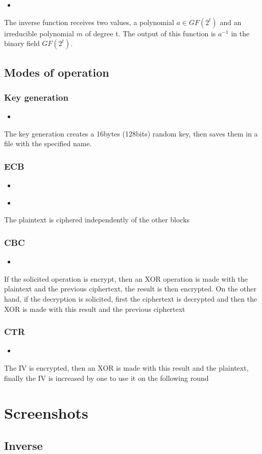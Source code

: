 \documentclass[titlepage, 12pt]{article}
\numberwithin{equation}{section}%
\numberwithin{figure}{section}%
\numberwithin{table}{section}%
\newcommand{\delimitCodeScript}[6][]{
	\begin{itemize}
		\item[]
	\end{itemize}	
}
\begin{document}
		\delimitCodeScript{c}{Section2CodeInverse/EuclidesPolinomios}{Inverse}{44}{84}
		The inverse function receives two values, a polynomial $a \in GF(2^{t})$ and an irreducible polynomial $m$ of degree t. The output of this function is $a^{-1}$ in the binary field $GF(2^{t})$.
		

	
	\subsection{Modes of operation}
	\subsubsection{Key generation}
		\delimitCodeScript{cpp}{Section2Code/Functions}{Key generation}{12}{23}
		The key generation creates a 16bytes (128bits) random key, then saves them in a file with the specified name.
	\subsubsection{ECB}
		\delimitCodeScript{cpp}{Section2Code/Functions}{ECB mode}{65}{66}
		\delimitCodeScript{cpp}{Section2Code/Functions}{AES}{127}{134}
		The plaintext is ciphered independently of the other blocks
	\subsubsection{CBC}
		\delimitCodeScript{cpp}{Section2Code/Functions}{CBC mode}{82}{97}
		If the solicited operation is encrypt, then an XOR operation is made with the plaintext and the previous ciphertext, the result is then encrypted.
		On the other hand, if the decryption is solicited, first the ciphertext is decrypted and then the XOR is made with this result and the previous ciphertext
	\subsubsection{CTR}
		\delimitCodeScript{cpp}{Section2Code/Functions}{CTR mode}{99}{106}
		The IV is encrypted, then an XOR is made with this result and the plaintext, finally the IV is increased by one to use it on the following round

	\section{Screenshots}
		\subsection{Inverse}
\end{document}
